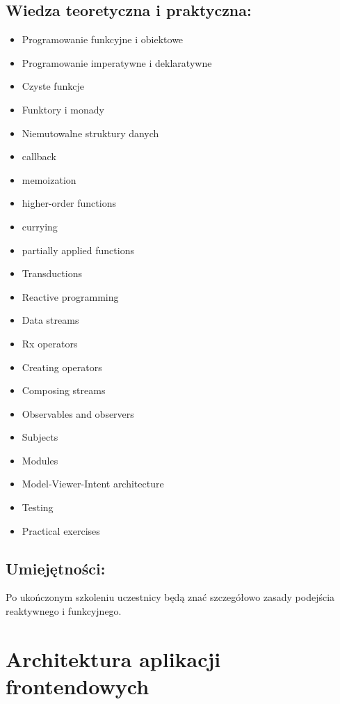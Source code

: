 \documentclass{article}[10pt]
\begin{document}
	\subsection*{Wiedza teoretyczna i praktyczna:}
\begin{adjustwidth}{1.5cm}{}
	\begin{itemize}
		\item Programowanie funkcyjne i obiektowe
		\item Programowanie imperatywne i deklaratywne
		\item Czyste funkcje
		\item Funktory i monady
		\item Niemutowalne struktury danych
		\item callback
		\item memoization
		\item higher-order functions
		\item currying
		\item partially applied functions
		\item Transductions
		\item Reactive programming
		\item Data streams
		\item Rx operators
		\item Creating operators
		\item Composing streams
		\item Observables and observers
		\item Subjects
		\item Modules
		\item Model-Viewer-Intent architecture
		\item Testing
		\item Practical exercises
	\end{itemize}
\end{adjustwidth}

	\subsection*{Umiejętności:}
\begin{adjustwidth}{2cm}{}
\justifying
	
Po ukończonym szkoleniu uczestnicy będą znać szczegółowo zasady podejścia reaktywnego i funkcyjnego.
\end{adjustwidth}

\newpage


    
	\section{Architektura aplikacji frontendowych}
\end{document}
